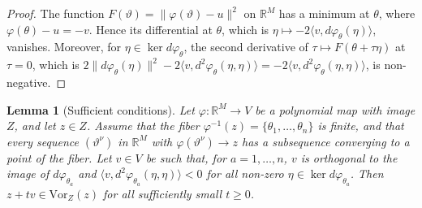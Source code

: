 \documentclass[11pt]{article}
\newtheorem{lemma}{Lemma}
\theoremstyle{definition}
\theoremstyle{remark}
\newcommand{\R}{\mathbb{R}}
\begin{document}
\begin{proof}
The function $F(\vartheta)=\|\varphi(\vartheta)-u\|^2$ on $\R^M$ has a minimum at $\theta$, where $\varphi(\theta)-u=-v$. Hence its differential at $\theta$, which is $\eta\mapsto-2\langle v,d\varphi_\theta(\eta)\rangle$, vanishes. Moreover, for $\eta\in\ker d\varphi_\theta$, the second derivative of $\tau\mapsto F(\theta+\tau\eta)$ at $\tau=0$, which is $2\|d\varphi_\theta(\eta)\|^2-2\langle v,d^2\varphi_\theta(\eta,\eta)\rangle=-2\langle v,d^2\varphi_\theta(\eta,\eta)\rangle$, is non-negative.
\end{proof}

\begin{lemma}[Sufficient conditions]\label{lem:sufficient}
Let $\varphi\colon\R^M\to V$ be a polynomial map with image $Z$, and let $z\in Z$. Assume that the fiber $\varphi^{-1}(z)=\{\theta_1,\dots,\theta_n\}$ is finite, and that every sequence $(\vartheta^\nu)$ in $\R^M$ with $\varphi(\vartheta^\nu)\to z$ has a subsequence converging to a point of the fiber. Let $v\in V$ be such that, for $a=1,\dots,n$, $v$ is orthogonal to the image of $d\varphi_{\theta_a}$ and $\langle v,d^2\varphi_{\theta_a}(\eta,\eta)\rangle<0$ for all non-zero $\eta\in\ker d\varphi_{\theta_a}$. Then $z+tv\in\mathrm{Vor}_Z(z)$ for all sufficiently small $t\ge0$.
\end{lemma}
\end{document}
